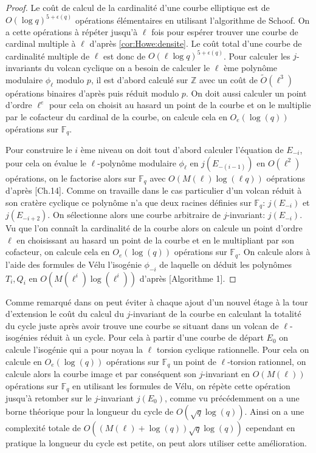 \documentclass[10pt,a4paper]{book}
\theoremstyle{plain}
\theoremstyle{definition}
\theoremstyle{definition}
\theoremstyle{definition}
\theoremstyle{definition}
\theoremstyle{remark}
\theoremstyle{remark}
\begin{document}
\begin{proof}
Le coût de calcul de la cardinalité d'une courbe elliptique est de $O(\log q)^{5+\epsilon(q)}$ opérations élémentaires en utilisant l'algorithme de Schoof. On a cette opérations à répéter jusqu'à $\ell$ fois pour espérer trouver une courbe de cardinal multiple à $\ell$ d'après \ref{cor:Howe:densite}. Le coût total d'une courbe de cardinalité multiple de $\ell$ est donc de  $O(\ell\log q)^{5+\epsilon(q)}$. Pour calculer les $j$-invariants du volcan cyclique on a besoin de calculer le $\ell$ ème polynôme modulaire $\phi_{\ell}$ modulo $p$, il est d'abord calculé sur $\mathbb{Z}$ avec un coût de $\tilde{O}(\ell^3)$ opérations binaires d'après \cite{enge2008} puis réduit modulo $p$. On doit aussi calculer un point d'ordre $\ell^e$ pour cela on choisit au hasard un point de la courbe et on le multiplie par le cofacteur du cardinal de la courbe, on calcule cela en $O_{e}(\log(q))$ opérations sur $\mathbb{F}_q$.

Pour construire le $i$ ème niveau on doit tout d'abord calculer l'équation de $E_{-i}$, pour cela on évalue le $\ell$-polynôme modulaire $\phi_{\ell}$ en $j(E_{-(i-1)})$ en $O(\ell^2)$ opérations, on le factorise alors sur $\mathbb{F}_q$ avec $O(M(\ell)\log(\ell q))$ oéprations d'après \cite{vzGJG03}[Ch.14]. Comme on travaille dans le cas particulier d'un volcan réduit à son cratère cyclique ce polynôme n'a que deux racines définies sur $\mathbb{F}_q$: $j(E_{-i})$ et $j(E_{-i+2})$. On sélectionne alors une courbe arbitraire de $j$-invariant: $j(E_{-i})$. Vu que l'on connaît la cardinalité de la courbe alors on calcule un point d'ordre $\ell$ en choisissant au hasard un point de la courbe et en le multipliant par son cofacteur, on calcule cela en $O_{e}(\log(q))$ opérations sur $\mathbb{F}_q$. On calcule alors à l'aide des formules de Vélu l'isogénie $\phi_{-i}$ de laquelle on déduit les polynômes $T_{i},Q_{i}$ en $O(M(\ell^i)\log(\ell^i))$ d'après \cite{DeFeo-Doliskani-Schost13}[Algorithme 1].
\end{proof}

Comme remarqué dans \cite{DeFeo-Doliskani-Schost13} on peut éviter à chaque ajout d'un nouvel étage à la tour d'extension le coût du calcul du $j$-invariant de la courbe en calculant la totalité du cycle juste après avoir trouve une courbe se situant dans un volcan de $\ell$-isogénies réduit à un cycle. Pour cela à partir d'une courbe de départ $E_0$ on calcule l'isogénie qui a pour noyau la $\ell$ torsion cyclique rationnelle. Pour cela on calcule en $O_e(\log(q))$ opérations sur $\mathbb{F}_q$ un point de $\ell$-torsion rationnel, on calcule alors
 la courbe image et par conséquent son $j$-invariant en $O(M(\ell))$ opérations sur $\mathbb{F}_q$ en utilisant les formules de Vélu, on répète cette opération jusqu'à retomber sur le $j$-invariant $j(E_0)$, comme vu précédemment on a une borne théorique pour la longueur du cycle de $O(\sqrt{q}\log(q))$. Ainsi on a une complexité totale de $O((M(\ell) + \log(q)) \sqrt{q} \log(q))$ cependant en pratique la longueur du cycle est petite, on peut alors utiliser cette amélioration.
\end{document}
